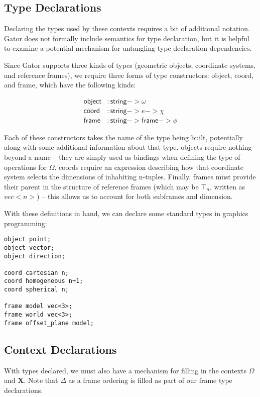 \documentclass{article}
\newcommand{\Chi}{\mathbf{X}}
\begin{document}
\subsection{Type Declarations}
Declaring the types used by these contexts requires a bit of additional notation.  Gator does not formally include semantics for type  declaration, but it is helpful to examine a potential mechanism for untangling type declaration dependencies.

Since Gator supports three kinds of types (geometric objects, coordinate systems, and reference frames), we require three forms of type constructors: \textsf{object}, \textsf{coord}, and \textsf{frame}, which have the following kinds:

\begin{align*}
\mathsf{object}&:\mathsf{string}->\omega\\
\mathsf{coord}&:\mathsf{string}->e->\chi\\
\mathsf{frame}&:\mathsf{string}->\mathsf{frame}->\phi
\end{align*}

Each of these constructors takes the name of the type being built, potentially along with some additional information about that type.  \textsf{object}s require nothing beyond a name -- they are simply used as bindings when defining the type of operations for $\Omega$.  \textsf{coord}s require an expression describing how that coordinate system selects the dimensions of inhabiting n-tuples.  Finally, \textsf{frame}s must provide their parent in the structure of reference frames (which may be $\top_n$, written as $vec<n>$) -- this allows us to account for both subframes and dimension.

With these definitions in hand, we can declare some standard types in graphics programming:

\begin{lstlisting}
object point;
object vector;
object direction;

coord cartesian n;
coord homogeneous n+1;
coord spherical n;

frame model vec<3>;
frame world vec<3>;
frame offset_plane model;
\end{lstlisting}

\subsection{Context Declarations}
With types declared, we must also have a mechanism for filling in the contexts $\Omega$ and $\Chi$.  Note that $\Delta$ as a frame ordering is filled as part of our \textsf{frame} type declarations.
\end{document}
